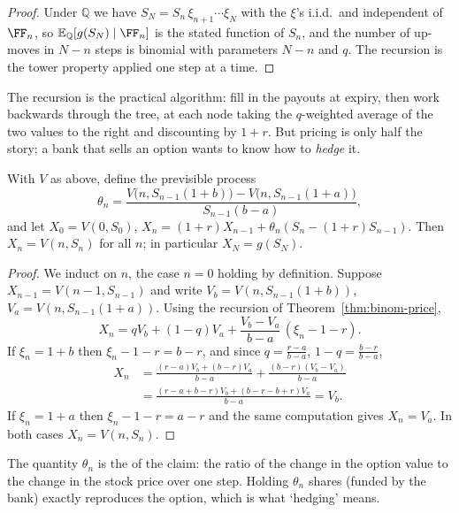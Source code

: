 \documentclass[a4paper]{scrartcl}
\newcommand{\QQ}{\mathbb{Q}}
\begin{document}
\begin{proof}
	Under $\QQ$ we have $S_N = S_n\,\xi_{n+1}\cdots\xi_N$ with the $\xi$'s i.i.d.\ and independent of $\FF_n$, so $\EE_\QQ[g(S_N)\mid\FF_n]$ is the stated function of $S_n$, and the number of up-moves in $N-n$ steps is binomial with parameters $N-n$ and $q$. The recursion is the tower property applied one step at a time.
\end{proof}

The recursion is the practical algorithm: fill in the payouts at expiry, then work backwards through the tree, at each node taking the $q$-weighted average of the two values to the right and discounting by $1+r$. But pricing is only half the story; a bank that sells an option wants to know how to \emph{hedge} it.

\begin{theorem}[Replication]\label{thm:binom-replication}
	With $V$ as above, define the previsible process
	$$
	\theta_n = \frac{V\big(n, S_{n-1}(1+b)\big) - V\big(n,S_{n-1}(1+a)\big)}{S_{n-1}(b-a)},
	$$
	and let $X_0 = V(0,S_0)$, $X_n = (1+r)X_{n-1} + \theta_n(S_n - (1+r)S_{n-1})$. Then $X_n = V(n,S_n)$ for all $n$; in particular $X_N = g(S_N)$.
\end{theorem}

\begin{proof}
	We induct on $n$, the case $n = 0$ holding by definition. Suppose $X_{n-1} = V(n-1,S_{n-1})$ and write $V_b = V(n,S_{n-1}(1+b))$, $V_a = V(n,S_{n-1}(1+a))$. Using the recursion of Theorem~\ref{thm:binom-price},
	$$
	X_n = qV_b + (1-q)V_a + \frac{V_b - V_a}{b-a}\,(\xi_n - 1 - r).
	$$
	If $\xi_n = 1+b$ then $\xi_n - 1 - r = b-r$, and since $q = \frac{r-a}{b-a}$, $1-q = \frac{b-r}{b-a}$,
	\begin{align*}
		X_n &= \frac{(r-a)V_b + (b-r)V_a}{b-a} + \frac{(b-r)(V_b-V_a)}{b-a}\\
		&= \frac{(r-a+b-r)V_b + (b-r-b+r)V_a}{b-a} = V_b.
	\end{align*}
	If $\xi_n = 1+a$ then $\xi_n - 1 - r = a - r$ and the same computation gives $X_n = V_a$. In both cases $X_n = V(n,S_n)$.
\end{proof}

The quantity $\theta_n$ is the  of the claim: the ratio of the change in the option value to the change in the stock price over one step. Holding $\theta_n$ shares (funded by the bank) exactly reproduces the option, which is what `hedging' means.
\end{document}

